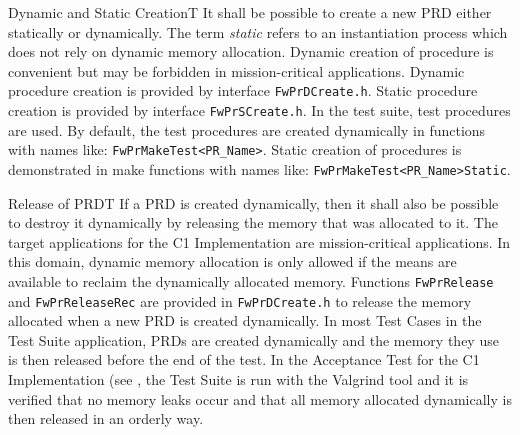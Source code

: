 \documentclass[a4paper,10pt]{article}
\newenvironment{fw_req}[6]
{\addtocounter{subsubsection}{1}
	\hspace{0.2cm}\textbf{FW-\arabic{section}.\arabic{subsection}.\arabic{subsubsection}/#2
	\hspace{0.8cm} #1}
	\vspace{-10pt}
\begin{longtable}{p{2.7cm}P{8.5cm}}
\hline
\textsc{Requirement} & #3 \\
\textsc{Justification} & #4 \\
\textsc{Implementation} & #5  \\ 
\textsc{Verification} & #6  \\
\hline
}
{\end{longtable}}
\newenvironment{fw_req_note}[7]
{\addtocounter{subsubsection}{1}
	\hspace{0.2cm}\textbf{FW-\arabic{section}.\arabic{subsection}.\arabic{subsubsection}/#2
	\hspace{0.8cm} #1}
	\vspace{-10pt}
\begin{longtable}{p{2.7cm}P{8.5cm}}
\hline
\textsc{Requirement} & #3 \\
\textsc{Note} & #4 \\
\textsc{Justification} & #5 \\
\textsc{Implementation} & #6  \\ 
\textsc{Verification} & #7  \\
\hline
}
{\end{longtable}}
\begin{document}
\begin{fw_req_note}{Dynamic and Static Creation}{T}
{ It shall be possible to create a new PRD either statically or 
dynamically.}
{The term \emph{static} refers to an instantiation process which does not rely on 
dynamic memory allocation.}
{Dynamic creation of procedure is convenient but may be forbidden in 
mission-critical applications.}
{Dynamic procedure creation is provided by interface 
\texttt{FwPrDCreate.h}. 
Static procedure creation is provided by interface \texttt{FwPrSCreate.h}.} 
{In the test suite, test procedures are used. By default, the test 
procedures are created dynamically in functions with names like: \texttt{FwPrMakeTest<PR\_Name>}. 
Static creation of procedures is demonstrated in make functions with names like: 
\texttt{FwPrMakeTest<PR\_Name>Static}.}
\end{fw_req_note}


\begin{fw_req}{Release of PRD}{T}
{If a PRD is created dynamically, then it shall also be possible to destroy 
it dynamically by releasing the memory that was allocated to it.}
{The target applications for the C1 Implementation are mission-critical 
applications. 
In this domain, dynamic memory allocation is only allowed if the means are available to reclaim 
the dynamically allocated memory.}
{Functions \texttt{FwPrRelease} and \texttt{FwPrReleaseRec} are provided 
in \texttt{FwPrDCreate.h} to release the memory allocated when a new PRD is created 
dynamically.} 
{In most Test Cases in the  Test Suite application, PRDs are created 
dynamically and the memory they use is then released before the end of the test. 
In the Acceptance Test for the C1 Implementation (see \cite{ref:um}, the Test Suite is run 
with the Valgrind tool and it is verified that no memory leaks occur and 
that all memory allocated dynamically is then released in an orderly way.}
\end{fw_req}
\end{document}
